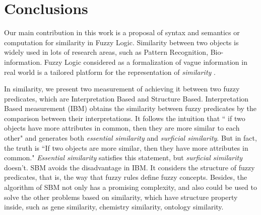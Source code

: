 \documentclass[Thesis.tex]{subfiles}
\begin{document}
\section{Conclusions}
\label{chap:Conclusions}

Our main contribution in this work is a proposal of syntax and semantics or computation for similarity
 in Fuzzy Logic.
Similarity between two objects is widely used in lots of research areas, such as Pattern Recognition, Bio-information. 
Fuzzy Logic considered as a formalization of vague information in real world is a tailored platform for the representation of \textit{similarity} .

In similarity, we present two measurement of achieving it between two fuzzy predicates, which are Interpretation Based and Structure Based. Interpretation Based measurement (IBM) obtains the similarity between fuzzy predicates by the comparison between their interpretations. 
It follows the intuition that `` if two objects have more attributes in common, then they are more similar to each other" and generates both \textit{essential similarity} and \textit{surficial similarity}.
But in fact, the truth is ``If two objects are more similar, then they have more attributes in common." 
\textit{Essential similarity} satisfies this statement, but \textit{surficial similarity} doesn't. SBM avoids the disadvantage in IBM. It considers the structure of fuzzy predicates, that is, the way that fuzzy rules define fuzzy concepts. Besides, the algorithm of SBM not only has a promising complexity, and also could be used to solve the other problems based on similarity, which have structure property inside, such as gene similarity, chemistry similarity, ontology similarity.

\end{document}
